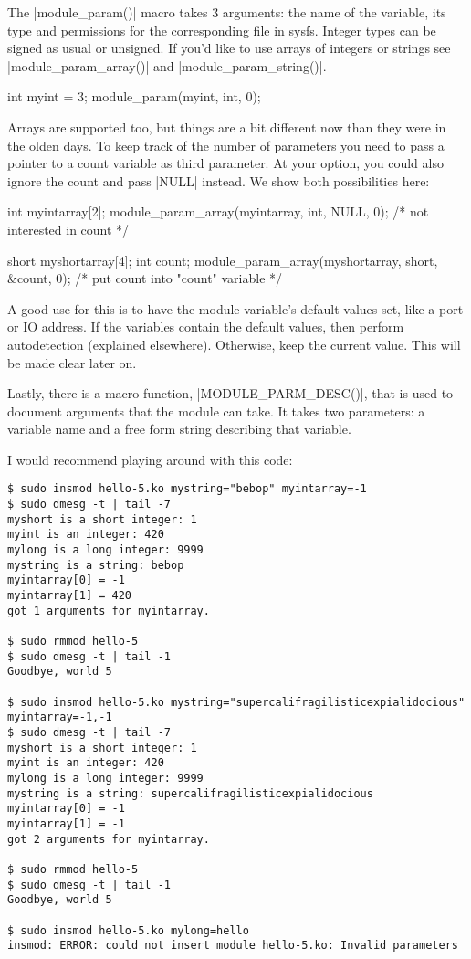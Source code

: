 \documentclass[10pt, oneside]{book}
\begin{document}
The \cpp|module_param()| macro takes 3 arguments: the name of the variable, its type and permissions for the corresponding file in sysfs.
Integer types can be signed as usual or unsigned. If you'd like to use arrays of integers or strings see \cpp|module_param_array()| and \cpp|module_param_string()|.

\begin{code}
int myint = 3;
module_param(myint, int, 0);
\end{code}

Arrays are supported too, but things are a bit different now than they were in the olden days.
To keep track of the number of parameters you need to pass a pointer to a count variable as third parameter. 
At your option, you could also ignore the count and pass \cpp|NULL| instead. We show both possibilities here:

\begin{code}
int myintarray[2];
module_param_array(myintarray, int, NULL, 0); /* not interested in count */

short myshortarray[4];
int count;
module_param_array(myshortarray, short, &count, 0); /* put count into "count" variable */
\end{code}

A good use for this is to have the module variable's default values set, like a port or IO address.
If the variables contain the default values, then perform autodetection (explained elsewhere). Otherwise, keep the current value.
This will be made clear later on.

Lastly, there is a macro function, \cpp|MODULE_PARM_DESC()|, that is used to document arguments that the module can take.
It takes two parameters: a variable name and a free form string describing that variable.


I would recommend playing around with this code:
\begin{verbatim}
$ sudo insmod hello-5.ko mystring="bebop" myintarray=-1
$ sudo dmesg -t | tail -7
myshort is a short integer: 1
myint is an integer: 420
mylong is a long integer: 9999
mystring is a string: bebop
myintarray[0] = -1
myintarray[1] = 420
got 1 arguments for myintarray.

$ sudo rmmod hello-5
$ sudo dmesg -t | tail -1
Goodbye, world 5

$ sudo insmod hello-5.ko mystring="supercalifragilisticexpialidocious" myintarray=-1,-1
$ sudo dmesg -t | tail -7
myshort is a short integer: 1
myint is an integer: 420
mylong is a long integer: 9999
mystring is a string: supercalifragilisticexpialidocious
myintarray[0] = -1
myintarray[1] = -1
got 2 arguments for myintarray.

$ sudo rmmod hello-5
$ sudo dmesg -t | tail -1
Goodbye, world 5

$ sudo insmod hello-5.ko mylong=hello
insmod: ERROR: could not insert module hello-5.ko: Invalid parameters
\end{verbatim}
\end{document}
